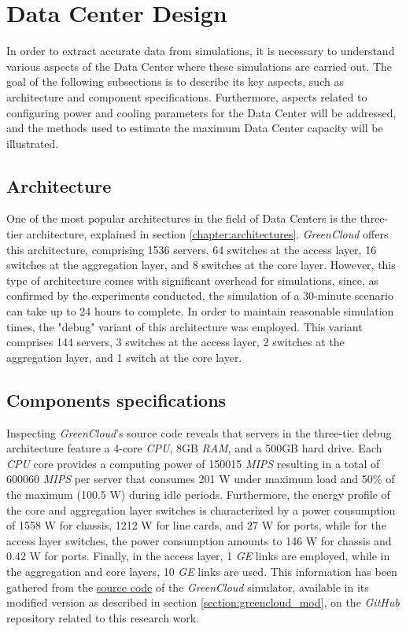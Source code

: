 \section{Data Center Design}
In order to extract accurate data from simulations, it is necessary to understand various aspects of the Data Center where these simulations are carried out. The goal of the following subsections is to describe its key aspects, such as architecture and component specifications. Furthermore, aspects related to configuring power and cooling parameters for the Data Center will be addressed, and the methods used to estimate the maximum Data Center capacity will be illustrated.

\subsection{Architecture}
One of the most popular architectures in the field of Data Centers is the three-tier architecture, explained in section \ref{chapter:architectures}. \emph{GreenCloud} offers this architecture, comprising 1536 servers, 64 switches at the access layer, 16 switches at the aggregation layer, and 8 switches at the core layer. However, this type of architecture comes with significant overhead for simulations, since, as confirmed by the experiments conducted, the simulation of a 30-minute scenario can take up to 24 hours to complete. In order to maintain reasonable simulation times, the "debug" variant of this architecture was employed. This variant comprises 144 servers, 3 switches at the access layer, 2 switches at the aggregation layer, and 1 switch at the core layer. 

\subsection{Components specifications} \label{subsection:components_spec}
Inspecting \emph{GreenCloud}'s source code reveals that servers in the three-tier debug architecture feature a 4-core \emph{CPU}, 8GB \emph{RAM}, and a 500GB hard drive. Each \emph{CPU} core provides a computing power of 150015 \emph{MIPS} resulting in a total of 600060 \emph{MIPS} per server that consumes 201 W under maximum load and 50\% of the maximum (100.5 W) during idle periods. Furthermore, the energy profile of the core and aggregation layer switches is characterized by a power consumption of 1558 W for chassis, 1212 W for line cards, and 27 W for ports, while for the access layer switches, the power consumption amounts to 146 W for chassis and 0.42 W for ports. Finally, in the access layer, 1 \emph{GE} links are employed, while in the aggregation and core layers, 10 \emph{GE} links are used. This information has been gathered from the \href{https://github.com/vincenzo-emanuele/masters-degree-thesis/tree/main/greencloud_modified_src}{source code} of the \emph{GreenCloud} simulator, available in its modified version as described in section \ref{section:greencloud_mod}, on the \emph{GitHub} repository related to this research work. 

